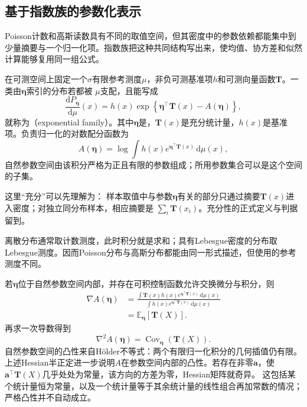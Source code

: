 \subsection{基于指数族的参数化表示}
Poisson计数和高斯读数具有不同的取值空间，但其密度中的参数依赖都能集中到少量摘要与一个归一化项。指数族把这种共同结构写出来，使均值、协方差和似然计算能够复用同一组公式。
\begin{definition}[指数族]
  \label{def:probability-exponential-family}
在可测空间上固定一个\(\sigma\)有限参考测度\(\mu\)，非负可测基准项\(h\)和可测向量函数\(\bm T\)。一类由\(\bm{\eta}\)索引的分布若都被
\(\mu\)支配，且能写成
\begin{equation}
  \frac{\mathrm{d}P_{\bm{\eta}}}{\mathrm{d}\mu}(x)
  =
  h(x)\exp\left\{
    \bm{\eta}^{\top}\bm{T}(x)-A(\bm{\eta})
  \right\},
  \label{eq:probability-exponential-family}
\end{equation}
就称为（exponential family）。其中\(\bm{\eta}\)是，\(\bm{T}(x)\)是充分统计量，\(h(x)\)是基准项。负责归一化的对数配分函数为
\[ A(\bm{\eta})
  =\log\int h(x)e^{\bm{\eta}^{\top}\bm{T}(x)}\,\mathrm{d}\mu(x), \]
自然参数空间由该积分严格为正且有限的参数组成；所用参数集合可以是这个空间的子集。
\end{definition}
这里“充分”可以先理解为：
样本取值中与参数\(\bm{\eta}\)有关的部分只通过摘要\(\bm{T}(x)\)进入密度；对独立同分布样本，相应摘要是
\(\sum_i\bm{T}(x_i)\)。充分性的正式定义与判据留到。

离散分布通常取计数测度，此时积分就是求和；具有Lebesgue密度的分布取Lebesgue测度。因而Poisson分布与高斯分布都能由同一形式描述，但使用的参考测度不同。

若\(\bm{\eta}\)位于自然参数空间内部，并存在可积控制函数允许交换微分与积分，则
\[
\begin{aligned}
  \nabla A(\bm{\eta})
  &=
  \frac{\int \bm{T}(x)h(x)
  e^{\bm{\eta}^{\top}\bm{T}(x)}\,\mathrm{d}\mu(x)}
  {\int h(x)e^{\bm{\eta}^{\top}\bm{T}(x)}\,\mathrm{d}\mu(x)}\\
  &=
  \mathbb{E}_{\bm{\eta}}[\bm{T}(X)].
\end{aligned}
\]
再求一次导数得到
\begin{equation}
  \nabla^2 A(\bm{\eta})
  =
  \operatorname{Cov}_{\bm{\eta}}(\bm{T}(X)).
  \label{eq:probability-log-partition-hessian}
\end{equation}
自然参数空间的凸性来自Hölder不等式：两个有限归一化积分的几何插值仍有限。上述Hessian半正定进一步说明\(A\)在参数空间内部的凸性。若存在非零\(\bm a\)，使
\(\bm a^\top\bm T(X)\)几乎处处为常量，该方向的方差为零，Hessian矩阵就奇异。
这包括某个统计量恒为常量，以及一个统计量等于其余统计量的线性组合再加常数的情况；
严格凸性并不自动成立。

